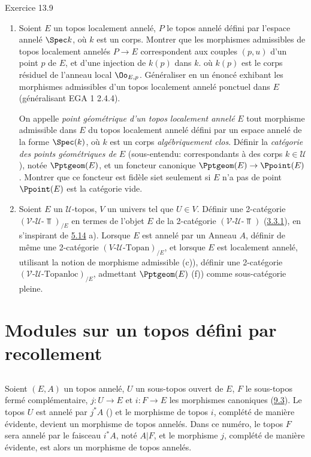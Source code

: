 \begin{enonce*}[remark]{Exercice 13.9}
\begin{enumerate}
\item Soient $E$ un topos localement annelé, $P$ le topos annelé
défini par l'espace annelé $\Spec k$, où $k$ est un corps. Montrer
que les morphismes admissibles de topos localement annelés
$P\rightarrow E$ correspondent aux couples $(p,u)$ d'un point $p$ de
$E$, et d'une injection de $k(p)$ dans $k$. où $k(p)$ est le corps
résiduel de l'anneau local ${\Oo}_{E,p}$. Généraliser en un
énoncé exhibant les morphismes admissibles d'un topos localement
annelé ponctuel dans $E$ (généralisant EGA 1 2.4.4).

On appelle \emph{point géométrique d'un topos localement
  annelé} $E$
tout morphisme admissible dans $E$ du topos localement annelé défini
par un espace annelé de la forme $\Spec(k)$, où $k$ est un corps
\emph{algébriquement clos}. Définir la \emph{catégorie des points
géométriques de} $E$ (sous-entendu: correspondants à des corps $k\in
𝒰$), notée $\Pptgeom(E)$, et un foncteur canonique
$\Pptgeom(E)\rightarrow \Ppoint(E)$. Montrer que ce foncteur est
fidèle si\pageoriginale et seulement si $E$ n'a pas de point \ie
$\Ppoint(E)$ est la catégorie vide.

\item Soient $E$ un $𝒰$-topos, $V$ un univers tel que $U\in
V$. Définir une 2-catégorie
$(𝒱\text{-}𝒰\text{-}\Top)_{/E}$ en termes de l'objet
$E$ de la 2-catégorie $(𝒱\text{-}𝒰\text{-}\Top)$
(\hyperref[IV.subsubsec3.3.1]{3.3.1}), en s'inspirant de \hyperref[IV.exer5.14]{5.14} a).
Lorsque $E$ est annelé par un Anneau $A$, définir de même une
2-catégorie $(V\text{-}𝒰\text{-}\text{Topan})_{/E}$, et
lorsque $E$ est localement annelé, utilisant la notion de morphisme
admissible (\cf c)), définir une 2-catégorie
$(𝒱\text{-}𝒰\text{-}\text{Topanloc})_{/E}$,
admettant $\Pptgeom(E)$ (\cf f)) comme sous-catégorie pleine.
\end{enumerate}
\end{enonce*}

\section{Modules sur un topos défini par recollement}

\subsection{}
Soient $(E,A)$ un topos annelé, $U$ un sous-topos ouvert de $E$, $F$
le sous-topos fermé complémentaire, $j:U\rightarrow E$ et
$i:F\rightarrow E$ les morphismes canoniques (\hyperref[IV.subsec9.3]{9.3}).
Le topos $U$ est annelé par $j^{\ast}A$ ()
et le morphisme de topos $i$, complété de manière évidente, devient
un morphisme de topos annelés. Dans ce numéro, le topos $F$ sera
annelé par le faisceau $i^{\ast}A$, noté $A| F$, et le morphisme
$j$, complété de manière évidente, est alors un morphisme de topos
annelés.



